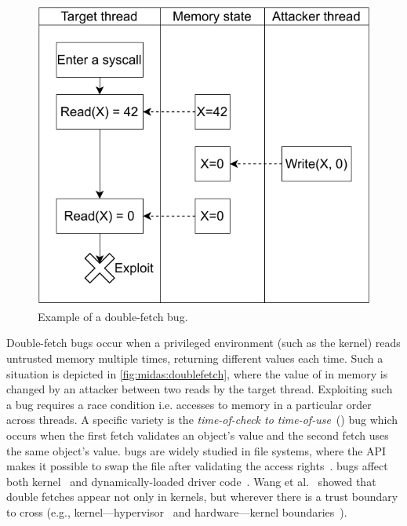 \begin{figure}[]
  \centering
  \includegraphics[width=.6\linewidth]{media/midas/doublefetch.pdf}
  \caption{Example of a double-fetch bug.}
  \label{fig:midas:doublefetch}
\end{figure}

Double-fetch bugs occur when a privileged environment (such as the kernel)
reads untrusted memory multiple times, returning different values each time.
Such a situation is depicted in \autoref{fig:midas:doublefetch}, 
where the value of  in memory is changed by an attacker
between two reads by the target thread.
Exploiting such a bug requires a race condition i.e. accesses 
to memory in a particular order across threads.
A specific variety is the \emph{time-of-check to time-of-use}~(\tocttou) 
bug which occurs when the first fetch validates an object's value and
the second fetch uses the same object's value.
\tocttou bugs are widely studied in file systems, where the
API makes it possible to swap the file after validating the access
rights~\cite{payer2012protecting,
pu2006methodical, wei2010modeling, tsafrir2008portably,Garfinkel03}.
\tocttou bugs affect both kernel~\cite{jurczyk2013bochspwn, wang2018survey}
and dynamically-loaded driver code~\cite{cve201812633,cve201812633fix}.
Wang et al.~\cite{wang2018survey} showed that double fetches appear not only
in kernels, but wherever there is a trust boundary to cross (e.g.,
kernel---hypervisor~\cite{wilhelm2016xenpwn} and hardware---kernel
boundaries~\cite{lu2018untrusted}).




